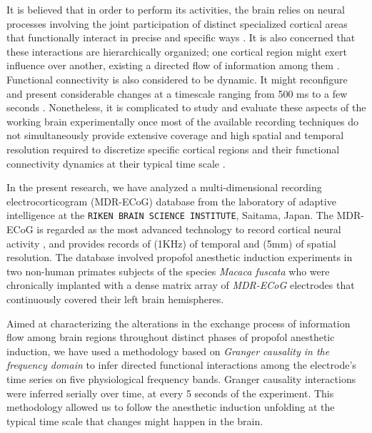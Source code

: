 \documentclass[twoside]{article}
\begin{document}
\begin{multicols}{2}
It is believed that in order to perform its activities, the brain relies on neural processes involving the joint participation of distinct specialized cortical areas that functionally interact in precise and specific ways \citep{mcintosh2000towards,stam2007graph,tononi1998consciousness}. It is also concerned that these interactions are hierarchically organized; one cortical region might exert influence over another, existing a directed flow of information among them \citep{seth2007distinguishing}. Functional connectivity is also considered to be dynamic. It might reconfigure and present considerable changes at a timescale ranging from 500 ms to a few seconds \citep{tononi1998consciousness,edelman2013consciousness}. 
Nonetheless, it is complicated to study and evaluate these aspects of the working brain experimentally once most of the available recording techniques do not simultaneously provide extensive coverage and high spatial and temporal resolution required to discretize specific cortical regions and their functional connectivity dynamics at their typical time scale \citep{tononi1998consciousness,nagasaka2011multidimensional}.


In the present research, we have analyzed a multi-dimensional recording electrocorticogram (MDR-ECoG) database from the laboratory of adaptive intelligence at the \texttt{RIKEN BRAIN SCIENCE INSTITUTE}, Saitama, Japan. The MDR-ECoG is regarded as the most advanced technology to record cortical neural activity \citep{nagasaka2011multidimensional,yanagawa2013large}, and provides records of (1KHz) of temporal and (5mm) of spatial resolution. The database involved propofol anesthetic induction experiments in two non-human primates subjects of the species \textit{Macaca fuscata} who were chronically implanted with a dense matrix array of \textit{MDR-ECoG} electrodes that continuously covered their left brain hemispheres. 

 
 Aimed at characterizing the alterations in the exchange process of information flow among brain regions throughout distinct phases of propofol anesthetic induction, we have used a methodology based on \textit{Granger causality in the frequency domain} \citep{granger1969investigating,seth2007distinguishing} to infer directed functional interactions among the electrode's time series on five physiological frequency bands. Granger causality interactions were inferred serially over time, at every 5 seconds of the experiment. This methodology allowed us to follow the anesthetic induction unfolding at the typical time scale that changes might happen in the brain. \\




\end{multicols}
\end{document}
